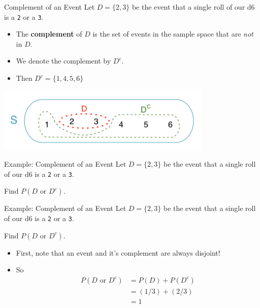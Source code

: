 \begin{frame}{Complement of an Event}
    Let $D=\{2,3\}$ be the event that a single roll of our d6 is a \texttt{2} or a \texttt{3}. 
    \begin{itemize}
        \item The \textbf{complement} of $D$ is the set of events in the sample space that are \textit{not} in $D$.
        \item We denote the complement by $D^c$.
        \item Then $D^c = \{1,4,5,6\}$
    \end{itemize}
    \begin{center}
        \includegraphics[scale=0.5]{images/comp.png}
    \end{center}
\end{frame}

\begin{frame}{Example: Complement of an Event}
    Let $D=\{2,3\}$ be the event that a single roll of our d6 is a \texttt{2} or a \texttt{3}. 
    
    \vspace{12pt}Find $P(D \text{ or } D^c)$. 
\end{frame}

\begin{frame}{Example: Complement of an Event}
    Let $D=\{2,3\}$ be the event that a single roll of our d6 is a \texttt{2} or a \texttt{3}. 
    
    \vspace{12pt}Find $P(D \text{ or } D^c)$. 
    \begin{itemize}
        \item First, note that an event and it's complement are always disjoint!
        \item So 
        \begin{align*}
            P(D \text{ or } D^c) &= P(D)+P(D^c) \\
            &= (1/3) + (2/3) \\
            &= 1
        \end{align*}
    \end{itemize}
\end{frame}

